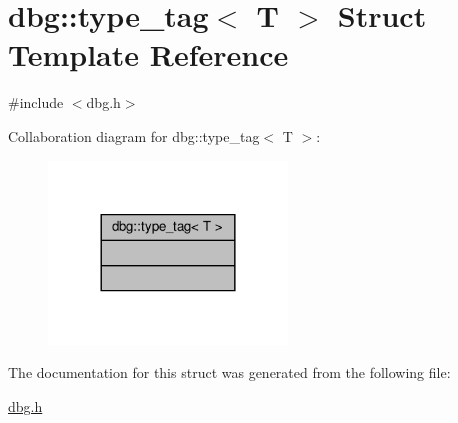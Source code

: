 \hypertarget{structdbg_1_1type__tag}{}\section{dbg\+:\+:type\+\_\+tag$<$ T $>$ Struct Template Reference}
\label{structdbg_1_1type__tag}


{\ttfamily \#include $<$dbg.\+h$>$}



Collaboration diagram for dbg\+:\+:type\+\_\+tag$<$ T $>$\+:\nopagebreak
\begin{figure}[H]
\begin{center}
\leavevmode
\includegraphics[width=180pt]{da/d6e/structdbg_1_1type__tag__coll__graph}
\end{center}
\end{figure}


The documentation for this struct was generated from the following file\+:\begin{DoxyCompactItemize}
\item 
\hyperlink{dbg_8h}{dbg.\+h}\end{DoxyCompactItemize}
